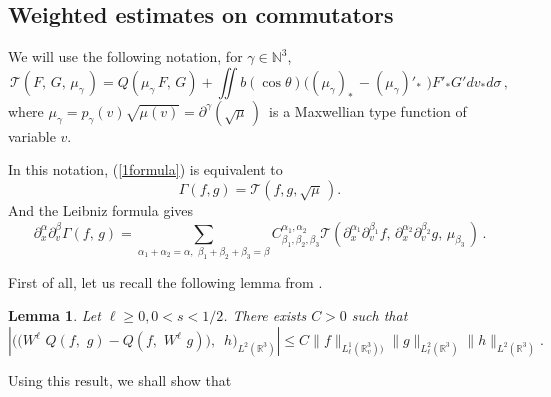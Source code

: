 \documentclass{amsart}[12pt, article]
\newtheorem{lemm}[theo]{Lemma}
\begin{document}
\subsection{Weighted estimates on commutators}\label{section3.2}
\setcounter{equation}{0}
 We will use the following notation, for $\gamma\in{{\mathbb N}}^3$,
\begin{equation}\label{3.1.1}
{{\mathcal T}}(F,\, G,\, \mu_\gamma\,)=Q(\mu_\gamma\, F,\, G)+ \iint
b(\cos\theta) \Big((\mu_\gamma)_*\, -(\mu_\gamma)'_*\,\,\Big)F'_* G'
d v_* d \sigma\,,
\end{equation}
where $\mu_\gamma=p_{\gamma}(v)\sqrt{\mu(v)}=\partial^\gamma
(\sqrt\mu\,)\,$ is a Maxwellian type function of variable $v$.

In this notation,
(\ref{1formula}) is equivalent to
$$
\Gamma(f, g) = {{\mathcal T}}(f, g, \sqrt\mu\,).
$$
And the Leibniz formula gives
\begin{equation}\label{3.1.2}
\partial^\alpha_x\partial^\beta_v\Gamma(f,\, g)=
\sum_{\alpha_1+\alpha_2=\alpha,\,\, \beta_1+\beta_2+\beta_3=\beta}
C^{\alpha_1, \alpha_2}_{\beta_1, \beta_2, \beta_3}
{{\mathcal T}}(\partial^{\alpha_1}_x\partial^{\beta_1}_v f,\,
\partial^{\alpha_2}_x\partial^{\beta_2}_v g,\, \mu_{\beta_3}\,)\, .
\end{equation}

First of all, let us recall the following lemma {}from \cite{amuxy-nonlinear-3}.
\begin{lemm}\label{lemm3.2.1}
Let $\ell \geq 0, 0<s<1/2 $. There exists $C>0$
such that
\begin{equation*}\label{3.2.1}
\left|\Big(\big(W^\ell  \,\, Q(f,\,\,g)-Q(f,\,\,W^\ell  \,\,
g)\big),\,\,\, h\Big)_{L^2({{{\mathbb R}}}^3)}\right| \leq C
\|f\|_{L^1_{\ell}({{{\mathbb R}}}^3_v))}\|g\|_{L^2_{\ell} ({{{\mathbb R}}}^3)}
\|h\|_{L^2({{{\mathbb R}}}^3)}.
\end{equation*}
\end{lemm}

Using this result, we shall show that
\end{document}
